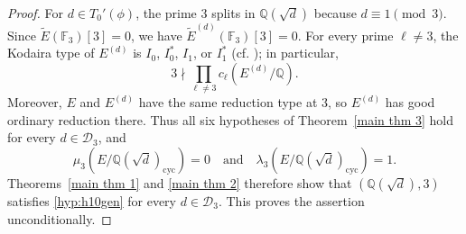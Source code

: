 \documentclass[12pt]{amsart}
\newtheorem{lemma}[theorem]{Lemma}
\newcommand{\Q}{\mathbb{Q}}
\newcommand{\F}{\mathbb{F}}
\newcommand{\op}[1]{\operatorname{#1}}
\numberwithin{equation}{section}
\begin{document}
\begin{proof}
For $d\in T_0'(\phi)$, the prime $3$ splits in $\Q(\sqrt d)$ because $d\equiv1\pmod 3$. Since $\widetilde E(\F_3)[3]=0$, we have $\widetilde E^{(d)}(\F_3)[3]=0$. For every prime $\ell\neq3$, the Kodaira type of $E^{(d)}$ is $I_0$, $I_0^*$, $I_1$, or $I_1^*$ (cf. \cite[Table~3]{BKOS}); in particular,
\[
3\nmid\prod_{\ell\neq3}c_\ell(E^{(d)}/\Q).
\]
Moreover, $E$ and $E^{(d)}$ have the same reduction type at $3$, so $E^{(d)}$ has good ordinary reduction there. Thus all six hypotheses of Theorem~\ref{main thm 3} hold for every $d\in\mathcal D_3$, and
\[
\mu_3(E/\Q(\sqrt d)_{\op{cyc}})=0
\quad\text{and}\quad
\lambda_3(E/\Q(\sqrt d)_{\op{cyc}})=1.
\]
Theorems~\ref{main thm 1} and \ref{main thm 2} therefore show that $(\Q(\sqrt d),3)$ satisfies \eqref{hyp:h10gen} for every $d\in\mathcal D_3$. This proves the assertion unconditionally.
\end{proof}





\end{document}
